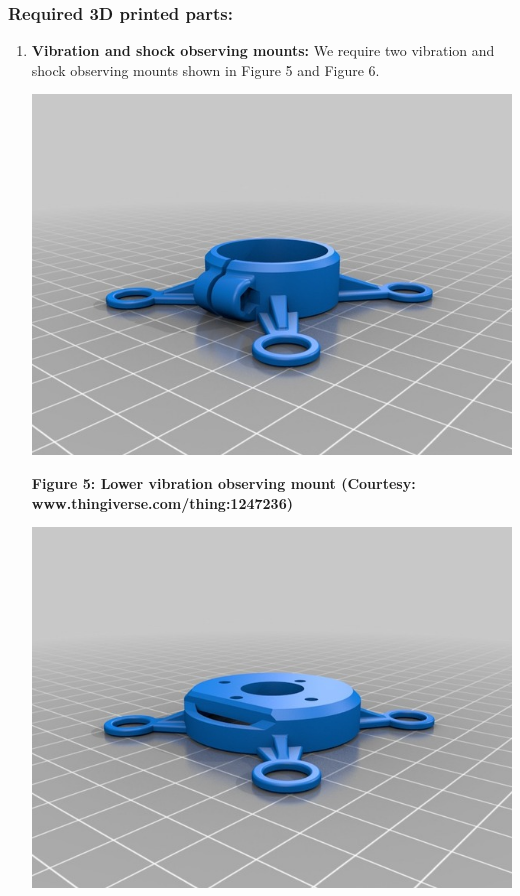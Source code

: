 \documentclass[11pt,a4paper]{article}
\begin{document}
		\subsubsection{Required 3D printed parts:}
		\begin{enumerate}
			\item \textbf{Vibration and shock observing mounts:} We require two vibration and shock observing mounts shown in Figure 5 and Figure 6.
			\begin{center}
				\includegraphics[scale=0.5]{../Images/lower_vibration_observing_mount.jpg}
			\end{center}
			\begin{center}
				\textbf{Figure 5: Lower vibration observing mount (Courtesy: www.thingiverse.com/thing:1247236)}
			\end{center}
			\begin{center}
				\includegraphics[scale=0.5]{../Images/upper_vibration_observing_mount.jpg}

\end{center}
\end{enumerate}
\end{document}
